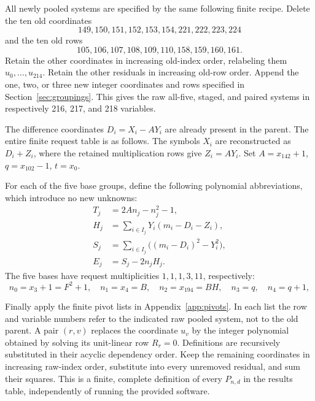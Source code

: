 \documentclass[11pt]{article}
\theoremstyle{definition}\newtheorem{definition}[theorem]{Definition}
\theoremstyle{remark}\newtheorem{remark}[theorem]{Remark}
\begin{document}
All newly pooled systems are specified by the same following finite recipe.
Delete the ten old coordinates
\begin{equation}
149,150,151,152,153,154,221,222,223,224
\label{eq:deleted-variables}
\end{equation}
and the ten old rows
\begin{equation}
105,106,107,108,109,110,158,159,160,161.
\label{eq:deleted-rows}
\end{equation}
Retain the other coordinates in increasing old-index order, relabeling them
$u_0,\ldots,u_{214}$. Retain the other residuals in increasing old-row
order. Append the one, two, or three new integer coordinates and rows
specified in Section~\ref{sec:groupings}. This gives the raw all-five,
staged, and paired systems in respectively 216, 217, and 218 variables.

The difference coordinates $D_i=X_i-AY_i$ are already present in the
parent. The entire finite request table is as follows. The symbols $X_i$
are reconstructed as $D_i+Z_i$, where the retained multiplication rows
give $Z_i=AY_i$. Set $A=x_{142}+1$, $q=x_{102}-1$, $t=x_0$.



For each of the five base groups, define the following polynomial
abbreviations, which introduce no new unknowns:
\begin{align}
T_j&=2An_j-n_j^2-1,\nonumber\\
H_j&=\sum_{i\in I_j}Y_i(m_i-D_i-Z_i),\nonumber\\
S_j&=\sum_{i\in I_j}\bigl((m_i-D_i)^2-Y_i^2\bigr),\nonumber\\
E_j&=S_j-2n_jH_j.\label{eq:group-definitions}
\end{align}
The five bases have request multiplicities $1,1,1,3,11$, respectively:
\[
n_0=x_3+1=F^2+1,\quad n_1=x_4=B,\quad n_2=x_{194}=BH,
\quad n_3=q,\quad n_4=q+1,
\]

Finally apply the finite pivot lists in Appendix~\ref{app:pivots}. In each
list the row and variable numbers refer to the indicated raw pooled
system, not to the old parent. A pair $(r,v)$ replaces the coordinate
$u_v$ by the integer polynomial obtained by solving its unit-linear row
$R_r=0$. Definitions are recursively substituted in their acyclic
dependency order. Keep the remaining coordinates in increasing raw-index
order, substitute into every unremoved residual, and sum their squares.
This is a finite, complete definition of every $P_{n,d}$ in the results
table, independently of running the provided software.
\end{document}
